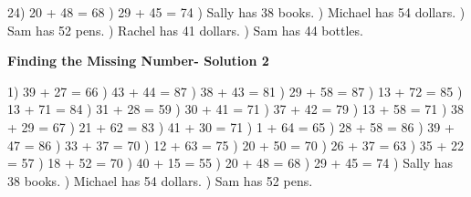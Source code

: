 \documentclass{article}%
\begin{document}
24) 20 + 48 = 68%
) 29 + 45 = 74%
) Sally has 38 books.%
) Michael has 54 dollars.%
) Sam has 52 pens.%
) Rachel has 41 dollars.%
) Sam has 44 bottles.%
\newline%
\newpage%
\large%
\begin{center}%
\textbf{Finding the Missing Number- Solution 2}%
\newline%
\end{center} \normalsize%
1) 39 + 27 = 66%
) 43 + 44 = 87%
) 38 + 43 = 81%
) 29 + 58 = 87%
) 13 + 72 = 85%
) 13 + 71 = 84%
) 31 + 28 = 59%
) 30 + 41 = 71%
) 37 + 42 = 79%
) 13 + 58 = 71%
) 38 + 29 = 67%
) 21 + 62 = 83%
) 41 + 30 = 71%
) 1 + 64 = 65%
) 28 + 58 = 86%
) 39 + 47 = 86%
) 33 + 37 = 70%
) 12 + 63 = 75%
) 20 + 50 = 70%
) 26 + 37 = 63%
) 35 + 22 = 57%
) 18 + 52 = 70%
) 40 + 15 = 55%
) 20 + 48 = 68%
) 29 + 45 = 74%
) Sally has 38 books.%
) Michael has 54 dollars.%
) Sam has 52 pens.%
\end{document}
